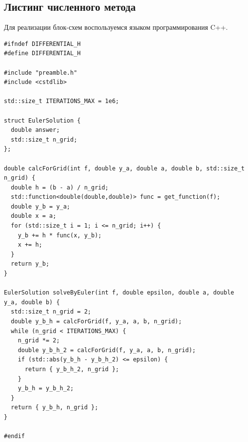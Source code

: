\subsection{Листинг численного метода}

Для реализации блок-схем воспользуемся языком программирования C++.

\begin{lstlisting}[caption=Файл \texttt{differential.hpp}]
#ifndef DIFFERENTIAL_H
#define DIFFERENTIAL_H

#include "preamble.h"
#include <cstdlib>

std::size_t ITERATIONS_MAX = 1e6;

struct EulerSolution {
  double answer;
  std::size_t n_grid;
};

double calcForGrid(int f, double y_a, double a, double b, std::size_t n_grid) {
  double h = (b - a) / n_grid;
  std::function<double(double,double)> func = get_function(f);
  double y_b = y_a;
  double x = a;
  for (std::size_t i = 1; i <= n_grid; i++) {
    y_b += h * func(x, y_b);
    x += h;
  }
  return y_b;
}

EulerSolution solveByEuler(int f, double epsilon, double a, double y_a, double b) {
  std::size_t n_grid = 2;
  double y_b_h = calcForGrid(f, y_a, a, b, n_grid);
  while (n_grid < ITERATIONS_MAX) {
    n_grid *= 2;
    double y_b_h_2 = calcForGrid(f, y_a, a, b, n_grid);
    if (std::abs(y_b_h - y_b_h_2) <= epsilon) {
      return { y_b_h_2, n_grid };
    }
    y_b_h = y_b_h_2;
  }
  return { y_b_h, n_grid };
}

#endif
\end{lstlisting}


